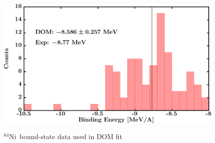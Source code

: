\documentclass[twocolumn,secnumarabic,amssymb, nobibnotes, aps, prl,
superscriptaddress, nobalancelastpage, draft]{revtex4}
\newcommand{\niFour}{\ensuremath{^{64}}N\lowercase{i}}
\begin{document}
\begin{figure}[!htb]
\begin{minipage}{0.4\linewidth}
        \label{DOM_ni64_RMSRadius}
    \end{minipage}
    \begin{minipage}{0.4\linewidth}
        \centering
        \includegraphics[width=\linewidth]{figures/ni64_BE.png}
        \label{DOM_ni64_BE}
    \end{minipage}
    \caption{\niFour\ bound-state data used in DOM fit}
    \label{DOM_ni64_structural}
\end{figure}
\end{document}
